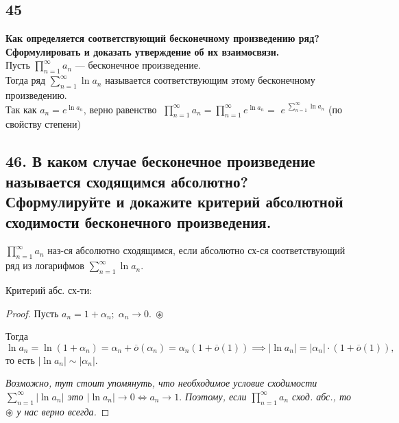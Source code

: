 \documentclass[a4paper, fleqn]{article}
\begin{document}
    \subsection*{45}
        \textbf{Как определяется соответствующий бесконечному произведению ряд? Сформулировать и доказать утверждение об их взаимосвязи.} \\[5 pt]
    Пусть $\prod\limits_{n = 1}^{\infty} a_n$ --- бесконечное произведение. \\[3 pt]
    Тогда ряд $\sum\limits_{n = 1}^{\infty} \ln a_n$ называется соответствующим этому бесконечному произведению. \\[3 pt]
    Так как $a_n = e ^{\ln a_n}$, верно равенство $\; \prod\limits_{n = 1}^{\infty} a_n = \prod\limits_{n = 1}^{\infty} e^{\ln a_n} = $ 
    {\large $e^{\;\sum\limits_{n = 1}^{\infty} \ln a_n}$ } (по свойству степени)    
        
    \subsection*{46. В каком случае бесконечное произведение называется сходящимся абсолютно? Сформулируйте и докажите критерий абсолютной сходимости бесконечного произведения.}
    
    $\displaystyle \prod_{n = 1}^{\infty} a_n$ наз-ся абсолютно сходящимся, если абсолютно сх-ся соответствующий ряд из логарифмов $\displaystyle \sum_{n = 1}^{\infty} \ln a_n$.
    
    Критерий абс. сх-ти:
    
    
    \begin{proof}
    
    Пусть $a_n = 1 + \alpha_n; \; \alpha_n \to 0. \; \circledast$
    
    Тогда $\ln a_n = \ln (1 + \alpha_n) = \alpha_n + \overline{o} (\alpha_n ) =  \alpha_n(1 + \overline{o} (1)) \implies
    |\ln a_n| = |\alpha_n| \cdot (1 + \overline{o} (1)),$ то есть $|\ln a_n| \sim |\alpha_n|.$
    
    \textit{Возможно, тут стоит упомянуть, что необходимое условие сходимости $\displaystyle \sum_{n = 1}^{\infty} |\ln a_n|$ это $|\ln a_n| \to 0 \iff a_n \to 1.$ Поэтому, если $\displaystyle \prod_{n = 1}^{\infty} a_n$ сход. абс., то $\circledast$ у нас верно всегда.}
    
    \end{proof}
    
\end{document}
